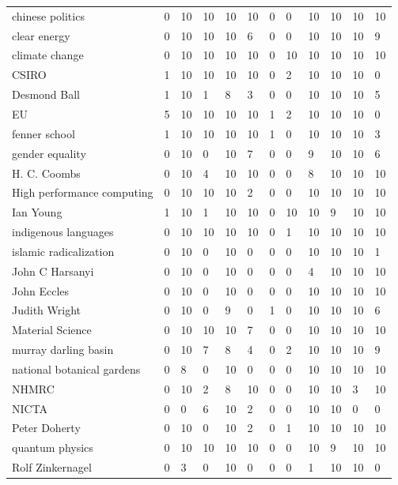 \begin{table}
\begin{tabular*}{0.5\textwidth}{|p{5cm}|l|l|l|l|l|l|l|l|l|l|l|}
chinese politics &0 &10 &10 &10 &10 &0 &0 &10 &10 &10 &10\\
\cline{1-12}
clear energy &0 &10 &10 &10 &6 &0 &0 &10 &10 &10 &9\\
\cline{1-12}
climate change &0 &10 &10 &10 &10 &0 &10 &10 &10 &10 &10\\
\cline{1-12}
CSIRO &1 &10 &10 &10 &10 &0 &2 &10 &10 &10 &0\\
\cline{1-12}
Desmond Ball &1 &10 &1 &8 &3 &0 &0 &10 &10 &10 &5\\
\cline{1-12}
EU &5 &10 &10 &10 &10 &1 &2 &10 &10 &10 &0\\
\cline{1-12}
fenner school &1 &10 &10 &10 &10 &1 &0 &10 &10 &10 &3\\
\cline{1-12}
gender equality &0 &10 &0 &10 &7 &0 &0 &9 &10 &10 &6\\
\cline{1-12}
H. C. Coombs &0 &10 &4 &10 &10 &0 &0 &8 &10 &10 &10\\
\cline{1-12}
High performance computing &0 &10 &10 &10 &2 &0 &0 &10 &10 &10 &10\\
\cline{1-12}
Ian Young &1 &10 &1 &10 &10 &0 &10 &10 &9 &10 &10\\
\cline{1-12}
indigenous languages &0 &10 &10 &10 &10 &0 &1 &10 &10 &10 &10\\
\cline{1-12}
islamic radicalization &0 &10 &0 &10 &0 &0 &0 &10 &10 &10 &1\\
\cline{1-12}
John C Harsanyi &0 &10 &0 &10 &0 &0 &0 &4 &10 &10 &10\\
\cline{1-12}
John Eccles &0 &10 &0 &10 &0 &0 &0 &10 &10 &10 &10\\
\cline{1-12}
Judith Wright &0 &10 &0 &9 &0 &1 &0 &10 &10 &10 &6\\
\cline{1-12}
Material Science &0 &10 &10 &10 &7 &0 &0 &10 &10 &10 &10\\
\cline{1-12}
murray darling basin &0 &10 &7 &8 &4 &0 &2 &10 &10 &10 &9\\
\cline{1-12}
national botanical gardens &0 &8 &0 &10 &0 &0 &0 &10 &10 &10 &10\\
\cline{1-12}
NHMRC &0 &10 &2 &8 &10 &0 &0 &10 &10 &3 &10\\
\cline{1-12}
NICTA &0 &0 &6 &10 &2 &0 &0 &10 &10 &0 &0\\
\cline{1-12}
Peter Doherty &0 &10 &0 &10 &2 &0 &1 &10 &10 &10 &10\\
\cline{1-12}
quantum physics &0 &10 &10 &10 &10 &0 &0 &10 &9 &10 &10\\
\cline{1-12}
Rolf Zinkernagel &0 &3 &0 &10 &0 &0 &0 &1 &10 &10 &0\\
\cline{1-12}

\end{tabular*}
\end{table}
